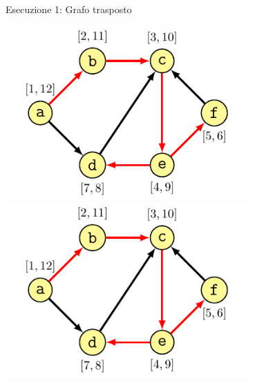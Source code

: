 \begin{frame}{Esecuzione 1: Grafo trasposto}
    
\begin{overprint}
\centering\includegraphics[width=0.7\textwidth,page=2]{scc3.pdf}
\centering\includegraphics[width=0.7\textwidth,page=3]{scc3.pdf}
\end{overprint}

\end{frame}


